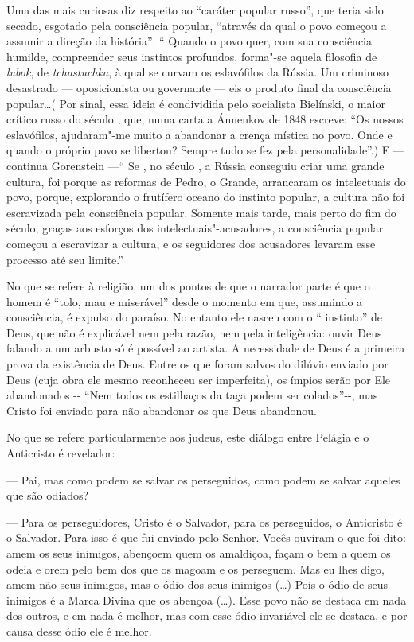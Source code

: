 Uma das mais curiosas diz respeito ao ``caráter popular russo'', que
teria sido secado, esgotado pela consciência popular, ``através da qual
o povo começou a assumir a direção da história'': `` Quando o povo quer,
com sua consciência humilde, compreender seus instintos profundos,
forma"-se aquela filosofia de \emph{lubok}, de \emph{tchastuchka}, à qual
se curvam os eslavófilos da Rússia. Um criminoso desastrado ---
oposicionista ou governante --- eis o produto final da consciência
popular\ldots{}( Por sinal, essa ideia é condividida pelo socialista
Bielínski, o maior crítico russo do século , que, numa carta a
Ánnenkov de 1848 escreve: ``Os nossos eslavófilos, ajudaram"-me muito a
abandonar a crença mística no povo. Onde e quando o próprio povo se
libertou? Sempre tudo se fez pela personalidade''.) E --- continua
Gorenstein ---`` Se , no século , a Rússia conseguiu criar uma grande
cultura, foi porque as reformas de Pedro, o Grande, arrancaram os
intelectuais do povo, porque, explorando o frutífero oceano do instinto
popular, a cultura não foi escravizada pela consciência popular. Somente
mais tarde, mais perto do fim do século, graças aos esforços dos
intelectuais"-acusadores, a consciência popular começou a escravizar a
cultura, e os seguidores dos acusadores levaram esse processo até seu
limite.''

No que se refere à religião, um dos pontos de que o narrador parte é que
o homem é ``tolo, mau e miserável'' desde o momento em que, assumindo a
consciência, é expulso do paraíso. No entanto ele nasceu com o ``
instinto'' de Deus, que não é explicável nem pela razão, nem pela
inteligência: ouvir Deus falando a um arbusto só é possível ao artista.
A necessidade de Deus é a primeira prova da existência de Deus. Entre os
que foram salvos do dilúvio enviado por Deus (cuja obra ele mesmo
reconheceu ser imperfeita), os ímpios serão por Ele abandonados -\/-
``Nem todos os estilhaços da taça podem ser colados''-\/-, mas Cristo
foi enviado para não abandonar os que Deus abandonou.

No que se refere particularmente aos judeus, este diálogo entre Pelágia
e o Anticristo é revelador:

--- Pai, mas como podem se salvar os perseguidos, como podem se salvar
aqueles que são odiados?

--- Para os perseguidores, Cristo é o Salvador, para os perseguidos, o
Anticristo é o Salvador. Para isso é que fui enviado pelo Senhor. Vocês
ouviram o que foi dito: amem os seus inimigos, abençoem quem os
amaldiçoa, façam o bem a quem os odeia e orem pelo bem dos que os magoam
e os perseguem. Mas eu lhes digo, amem não seus inimigos, mas o ódio dos
seus inimigos (\ldots{}) Pois o ódio de seus inimigos é a Marca Divina que os
abençoa (\ldots{}). Esse povo não se destaca em nada dos outros, e em nada é
melhor, mas com esse ódio invariável ele se destaca, e por causa desse
ódio ele é melhor.

